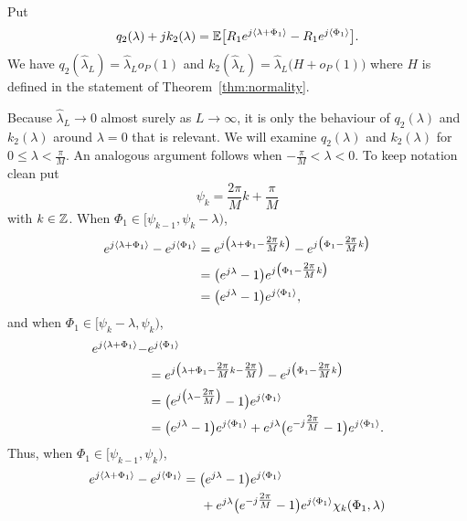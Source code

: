 \documentclass[journal]{IEEEtran}
\begin{document}
\begin{lemma}\label{lem:q2k2parts}
Put
\[
q_2(\lambda) + j k_2(\lambda) = {\mathbb E}\big[ R_1 e^{j\left\langle \lambda + \Phi_1 \right\rangle} - R_1 e^{j\left\langle \Phi_1 \right\rangle}  \big].
\]
We have $q_2(\hat{\lambda}_L) = \hat{\lambda}_L o_P(1)$ and $k_2(\hat{\lambda}_L) = \hat{\lambda}_L \big( H + o_P(1) \big)$ where $H$ is defined in the statement of Theorem~\ref{thm:normality}.
\end{lemma}
\begin{IEEEproof}
Because $\hat{\lambda}_L \rightarrow 0$ almost surely as $L\rightarrow\infty$, it is only the behaviour of $q_2(\lambda)$ and $k_2(\lambda)$ around $\lambda = 0$ that is relevant.  We will examine $q_2(\lambda)$ and $k_2(\lambda)$ for $0 \leq \lambda < \tfrac{\pi}{M}$.  An analogous argument follows when $-\tfrac{\pi}{M} < \lambda < 0$.  To keep notation clean put 
\[
\psi_k = \frac{2\pi}{M}k + \frac{\pi}{M}
\] 
with $k \in {\mathbb Z}$.  When $\Phi_1 \in [\psi_{k-1}, \psi_k - \lambda)$,
\begin{align*}
e^{j\left\langle \lambda + \Phi_1 \right\rangle} - e^{j\left\langle \Phi_1 \right\rangle} &=  e^{j\big(\lambda + \Phi_1 - \tfrac{2\pi}{M}k\big)} - e^{j\big( \Phi_1- \tfrac{2\pi}{M}k\big)} \\
&= \big(e^{j\lambda} - 1 \big) e^{j\big(\Phi_1- \tfrac{2\pi}{M}k\big)} \\
&= \big(e^{j\lambda} - 1 \big) e^{j\left\langle \Phi_1 \right\rangle},
\end{align*}
and when $\Phi_1 \in [\psi_{k} - \lambda, \psi_k)$,
\begin{align*}
e^{j\left\langle \lambda + \Phi_1 \right\rangle} - &e^{j\left\langle \Phi_1 \right\rangle} \\
&=  e^{j\big(\lambda + \Phi_1 - \tfrac{2\pi}{M}k - \tfrac{2\pi}{M}\big)} - e^{j\big( \Phi_1- \tfrac{2\pi}{M}k\big)} \\
&= \big(e^{j\big(\lambda - \tfrac{2\pi}{M}\big)} - 1 \big) e^{j\left\langle \Phi_1 \right\rangle} \\
&= \big(e^{j\lambda} - 1 \big) e^{j\left\langle \Phi_1 \right\rangle}  + e^{j\lambda}\big( e^{-j\tfrac{2\pi}{M}} - 1 \big)e^{j\left\langle \Phi_1 \right\rangle}.
\end{align*}
Thus, when $\Phi_1 \in [\psi_{k-1}, \psi_k)$,
\begin{align*}
e^{j\left\langle \lambda + \Phi_1 \right\rangle} - e^{j\left\langle \Phi_1 \right\rangle} &= \big(e^{j\lambda} - 1 \big) e^{j\left\langle \Phi_1 \right\rangle} \\
&\hspace{0.5cm} + e^{j\lambda}\big( e^{-j\tfrac{2\pi}{M}} - 1 \big)e^{j\left\langle \Phi_1 \right\rangle} \chi_k(\Phi_1,\lambda)
\end{align*}

\end{IEEEproof}
\end{document}
